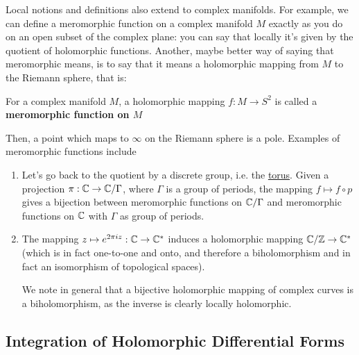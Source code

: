 \documentclass{article}
\begin{document}
Local notions and definitions also extend to complex manifolds. For example, we can define a meromorphic function on a complex manifold \(M\) exactly as you do on an open subset of the complex plane: you can say that locally it's given by the quotient of holomorphic functions. Another, maybe better way of saying that meromorphic means, is to say that it means a holomorphic mapping from \(M\) to the Riemann sphere, that is:
\begin{definition}
For a complex manifold \(M\), a holomorphic mapping \(f: M \to S^2\) is called a \textbf{meromorphic function on \(M\)}
\end{definition}
Then, a point which maps to \(\infty\) on the Riemann sphere is a pole. Examples of meromorphic functions include
\begin{enumerate}

  \item Let's go back to the quotient by a discrete group, i.e. the \hyperref[example:torus_complex_manifold]{torus}. Given a projection \(\pi: \mathbb{C} \to \mathbb{C}/\Gamma\), where \(\Gamma\) is a group of periods, the mapping \(f \mapsto f \circ p\) gives a bijection between meromorphic functions on \(\mathbb{C}/\Gamma\) and meromorphic functions on \(\mathbb{C}\) with \(\Gamma\) as group of periods.

  \item The mapping \(z \mapsto e^{2\pi iz}: \mathbb{C} \to \mathbb{C}^*\) induces a holomorphic mapping \(\mathbb{C}/\mathbb{Z} \to \mathbb{C}^*\) (which is in fact one-to-one and onto, and therefore a biholomorphism and in fact an isomorphism of topological spaces).

  We note in general that a bijective holomorphic mapping of complex curves is a biholomorphism, as the inverse is clearly locally holomorphic.

\end{enumerate}

\subsection{Integration of Holomorphic Differential Forms}
\end{document}
